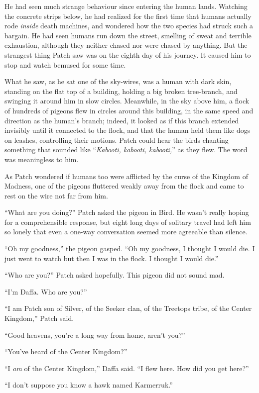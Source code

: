 \documentclass[ebook,oneside,openany,17pt]{memoir}
\begin{document}
He had seen much strange behaviour since entering the human
lands. Watching the concrete strips below, he had realized for the
first time that humans actually rode \emph{inside} death machines,
and wondered how the two species had struck such a bargain. He had
seen humans run down the street, smelling of sweat and terrible
exhaustion, although they neither chased nor were chased by
anything. But the strangest thing Patch saw was on the eighth day of
his journey. It caused him to stop and watch bemused for some time.

What he saw, as he sat one of the sky-wires, was a human with dark
skin, standing on the flat top of a building, holding a big broken
tree-branch, and swinging it around him in slow circles. Meanwhile, in
the sky above him, a flock of hundreds of pigeons flew in circles
around this building, in the same speed and direction as the human’s
branch; indeed, it looked as if this branch extended invisibly until
it connected to the flock, and that the human held them like dogs on
leashes, controlling their motions. Patch could hear the birds
chanting something that sounded like “\emph{Kabooti, kabooti,
kabooti,}” as they flew. The word was meaningless to him.

As Patch wondered if humans too were afflicted by the curse of the
Kingdom of Madness, one of the pigeons fluttered weakly away from the
flock and came to rest on the wire not far from him.

“What are you doing?” Patch asked the pigeon in Bird. He wasn’t really
hoping for a comprehensible response, but eight long days of solitary
travel had left him so lonely that even a one-way conversation seemed
more agreeable than silence.

“Oh my goodness,” the pigeon gasped. “Oh my goodness, I thought I
would die. I just went to watch but then I was in the flock. I thought
I would die.”

“Who are you?” Patch asked hopefully. This pigeon did not sound mad.

“I’m Daffa. Who are you?”

“I am Patch son of Silver, of the Seeker clan, of the Treetops tribe,
of the Center Kingdom,” Patch said.

“Good heavens, you’re a long way from home, aren’t you?”

“You’ve heard of the Center Kingdom?”

“I \emph{am} of the Center Kingdom,” Daffa said. “I flew here. How
did you get here?”

“I don’t suppose you know a hawk named Karmerruk.”
\end{document}
